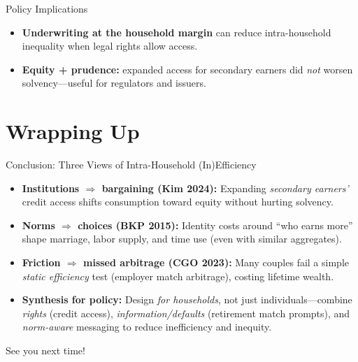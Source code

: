 \documentclass[11pt,notes=hide,aspectratio=169,mathserif]{beamer}
\begin{document}
\begin{frame}{Policy Implications}
\small
\begin{itemize}
  \item \textbf{Underwriting at the household margin} can reduce intra-household inequality when legal rights allow access.
  \item \textbf{Equity + prudence:} expanded access for secondary earners did \emph{not} worsen solvency—useful for regulators and issuers.
\end{itemize}
\end{frame}

\section{Wrapping Up}

\begin{frame}{Conclusion: Three Views of Intra-Household (In)Efficiency}
\small
\begin{itemize}
  \item \textbf{Institutions \(\Rightarrow\) bargaining (Kim 2024):} Expanding \emph{secondary earners’} credit access shifts consumption toward equity without hurting solvency.
  \item \textbf{Norms \(\Rightarrow\) choices (BKP 2015):} Identity costs around “who earns more” shape marriage, labor supply, and time use (even with similar aggregates).
  \item \textbf{Friction \(\Rightarrow\) missed arbitrage (CGO 2023):} Many couples fail a simple \emph{static efficiency} test (employer match arbitrage), costing lifetime wealth.
  \item \textbf{Synthesis for policy:} Design \emph{for households}, not just individuals—combine \emph{rights} (credit access), \emph{information/defaults} (retirement match prompts), and \emph{norm-aware} messaging to reduce inefficiency and inequity.
\end{itemize}
\end{frame}

\begin{frame}
\begin{center}{\LARGE See you next time!}\end{center}
\end{frame}

% 
% 
\end{document}
